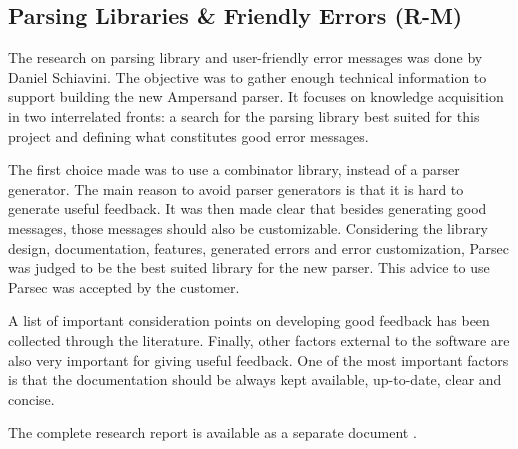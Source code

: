 

\subsection{Parsing Libraries \& Friendly Errors (R-M)}
\label{domain:parsing}
The research on parsing library and user-friendly error messages was done by Daniel Schiavini.
The objective was to gather enough technical information to support building the new Ampersand parser.
It focuses on knowledge acquisition in two interrelated fronts: a search for the parsing library best suited for this project and defining what constitutes good error messages.

The first choice made was to use a combinator library, instead of a parser generator.
The main reason to avoid parser generators is that it is hard to generate useful feedback.
It was then made clear that besides generating good messages, those messages should also be customizable.
Considering the library design, documentation, features, generated errors and error customization, Parsec was judged to be the best suited library for the new parser.
This advice to use Parsec was accepted by the customer.

A list of important consideration points on developing good feedback has been collected through the literature.
Finally, other factors external to the software are also very important for giving useful feedback.
One of the most important factors is that the documentation should be always kept available, up-to-date, clear and concise.

The complete research report is available as a separate document .
